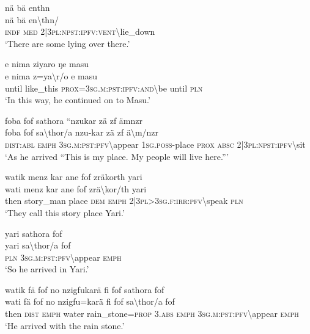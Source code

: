 \ea\label{ex:1:a3767}
nä bä enthn\\
\gll nä	bä	en{\textbackslash}thn/\\
     \textsc{indf}	\textsc{med}	2|3\textsc{pl}:\textsc{npst}:\textsc{ipfv}:\textsc{vent}{\textbackslash}lie\_down\\
\glt `There are some lying over there.'
\z

\ea\label{ex:1:a3768}
e nima ziyaro ŋe masu\\
\gll e	nima	z=ya{\textbackslash}r/o	e	masu\\
     until	like\_this	\textsc{prox}=3\textsc{sg}.\textsc{m}:\textsc{pst}:\textsc{ipfv}:\textsc{and}{\textbackslash}be	until	\textsc{pln}\\
\glt `In this way, he continued on to Masu.'
\z

\ea\label{ex:1:a3770}
foba fof sathora ``nzukar zä zf ämnzr\\
\gll foba	fof	sa{\textbackslash}thor/a	nzu-kar	zä	zf	ä{\textbackslash}m/nzr\\
     \textsc{dist}:\textsc{abl}	\textsc{emph}	3\textsc{sg}.\textsc{m}:\textsc{pst}:\textsc{pfv}{\textbackslash}appear	1\textsc{sg}.\textsc{poss}-place	\textsc{prox}	\textsc{absc}	2|3\textsc{pl}:\textsc{npst}:\textsc{ipfv}{\textbackslash}sit\\
\glt `As he arrived ``This is my place. My people will live here.'''
\z

\ea\label{ex:1:a3771}
watik menz kar ane fof zräkorth yari\\
\gll wati	menz	kar	ane	fof	zrä{\textbackslash}kor/th	yari\\
     then	story\_man	place	\textsc{dem}	\textsc{emph}	2|3\textsc{pl}>3\textsc{sg}.\textsc{f}:\textsc{irr}:\textsc{pfv}{\textbackslash}speak	\textsc{pln}\\
\glt `They call this story place Yari.'
\z

\ea\label{ex:1:a3772}
yari sathora fof\\
\gll yari	sa{\textbackslash}thor/a	fof\\
     \textsc{pln}	3\textsc{sg}.\textsc{m}:\textsc{pst}:\textsc{pfv}{\textbackslash}appear	\textsc{emph}\\
\glt `So he arrived in Yari.'
\z

\ea\label{ex:1:a3773}
watik fä fof no nzigfukarä fi fof sathora fof\\
\gll wati	fä	fof	no	nzigfu=karä	fi	fof	sa{\textbackslash}thor/a	fof\\
     then	\textsc{dist}	\textsc{emph}	water	rain\_stone=\textsc{prop}	3.\textsc{abs}	\textsc{emph}	3\textsc{sg}.\textsc{m}:\textsc{pst}:\textsc{pfv}{\textbackslash}appear	\textsc{emph}\\
\glt `He arrived with the rain stone.'
\z

